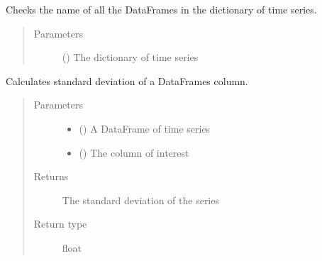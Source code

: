 \documentclass[letterpaper,10pt,english]{sphinxmanual}
\begin{document}

\begin{fulllineitems}
\label{\detokenize{eval_inspect:Foresight.eval_inspect.check_length}}
Checks the name of all the DataFrames in the dictionary of time series.
\begin{quote}\begin{description}
\item[{Parameters}] \leavevmode
{} () \textendash{} The dictionary of time series

\end{description}\end{quote}

\end{fulllineitems}


\begin{fulllineitems}
\label{\detokenize{eval_inspect:Foresight.eval_inspect.df_std}}
Calculates standard deviation of a DataFrames column.
\begin{quote}\begin{description}
\item[{Parameters}] \leavevmode\begin{itemize}
\item {} 
 () \textendash{} A DataFrame of time series

\item {} 
 () \textendash{} The column of interest

\end{itemize}

\item[{Returns}] \leavevmode
The standard deviation of the series

\item[{Return type}] \leavevmode
float

\end{description}\end{quote}

\end{fulllineitems}
\end{document}
